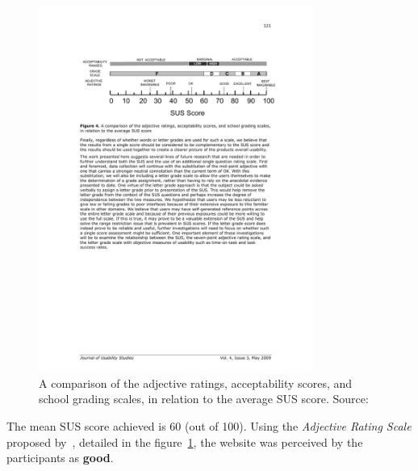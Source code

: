 \documentclass[a4paper]{article}
\begin{document}
\begin{figure}[h] 
	\centering
	\includegraphics[width=0.8\textwidth]{figures/sus_qualititative_scale.pdf}
 	\caption{A comparison of the adjective ratings, acceptability scores, and school grading scales, in relation to the average SUS score. Source:~\citep{bangor2009determining}}
	\label{fig:sus}
\end{figure}

The mean SUS score achieved is 60 (out of 100). Using the \textit{Adjective Rating Scale} proposed by~\citet{bangor2009determining}, detailed in the figure~\ref{fig:sus}, the website was perceived by the participants as \textbf{good}.
\end{document}
